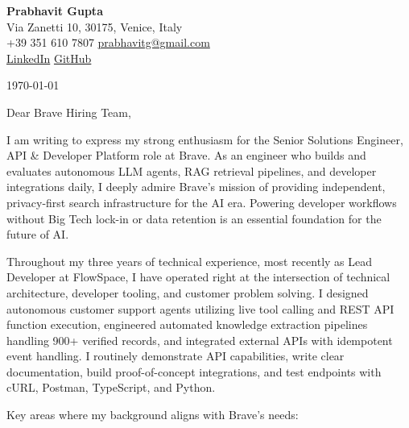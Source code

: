 \documentclass[11pt,a4paper]{article}
\begin{document}
\begin{center}
    {\huge \textbf{Prabhavit Gupta}} \\
    \vspace{4pt}
    Via Zanetti 10, 30175, Venice, Italy \\
    +39 351 610 7807 \textbar{} \href{mailto:prabhavitg@gmail.com}{prabhavitg@gmail.com} \\
    \href{https://www.linkedin.com/in/prabhavit/}{LinkedIn} \textbar{} \href{https://github.com/prab-gupta}{GitHub}
\end{center}

\vspace{14pt}

\noindent \today

\vspace{6pt}

\noindent Dear Brave Hiring Team,

\vspace{6pt}

\noindent I am writing to express my strong enthusiasm for the Senior Solutions Engineer, API \& Developer Platform role at Brave. As an engineer who builds and evaluates autonomous LLM agents, RAG retrieval pipelines, and developer integrations daily, I deeply admire Brave's mission of providing independent, privacy-first search infrastructure for the AI era. Powering developer workflows without Big Tech lock-in or data retention is an essential foundation for the future of AI.

\noindent Throughout my three years of technical experience, most recently as Lead Developer at FlowSpace, I have operated right at the intersection of technical architecture, developer tooling, and customer problem solving. I designed autonomous customer support agents utilizing live tool calling and REST API function execution, engineered automated knowledge extraction pipelines handling 900+ verified records, and integrated external APIs with idempotent event handling. I routinely demonstrate API capabilities, write clear documentation, build proof-of-concept integrations, and test endpoints with cURL, Postman, TypeScript, and Python.

\noindent Key areas where my background aligns with Brave's needs:
\end{document}
